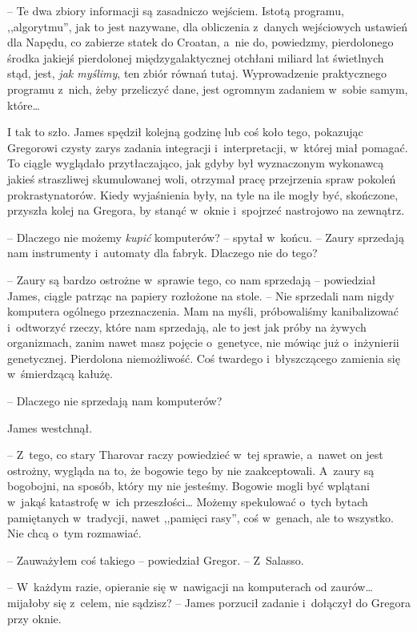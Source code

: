 \documentclass[oneside,polish,12pt,sfheadings]{mwbk}
\begin{document}
-- Te dwa zbiory informacji są zasadniczo wejściem. Istotą programu,
,,algorytmu'', jak to jest nazywane, dla obliczenia z~danych wejściowych
ustawień dla Napędu, co zabierze statek do Croatan, a~nie do, powiedzmy,
pierdolonego środka jakiejś pierdolonej międzygalaktycznej otchłani
miliard lat świetlnych stąd, jest, \emph{jak myślimy}, ten zbiór równań
tutaj. Wyprowadzenie praktycznego programu z~nich, żeby przeliczyć dane,
jest ogromnym zadaniem w~sobie samym, które\ldots

I tak to szło. James spędził kolejną godzinę lub coś koło tego,
pokazując Gregorowi czysty zarys zadania integracji i~interpretacji, w~której miał pomagać. To ciągle wyglądało przytłaczająco, jak gdyby był
wyznaczonym wykonawcą jakieś straszliwej skumulowanej woli, otrzymał
pracę przejrzenia spraw pokoleń prokrastynatorów. Kiedy wyjaśnienia
były, na tyle na ile mogły być, skończone, przyszła kolej na Gregora, by
stanąć w~oknie i~spojrzeć nastrojowo na zewnątrz.

-- Dlaczego nie możemy \emph{kupić} komputerów? -- spytał w~końcu. -- Zaury
sprzedają nam instrumenty i~automaty dla fabryk. Dlaczego nie do tego?

-- Zaury są bardzo ostrożne w~sprawie tego, co nam sprzedają -- powiedział
James, ciągle patrząc na papiery rozłożone na stole. -- Nie sprzedali nam
nigdy komputera ogólnego przeznaczenia. Mam na myśli, próbowaliśmy
kanibalizować i~odtworzyć rzeczy, które nam sprzedają, ale to jest jak
próby na żywych organizmach, zanim nawet masz pojęcie o~genetyce, nie
mówiąc już o~inżynierii genetycznej. Pierdolona niemożliwość. Coś
twardego i~błyszczącego zamienia się w~śmierdzącą kałużę.

-- Dlaczego nie sprzedają nam komputerów?

James westchnął. 

-- Z~tego, co stary Tharovar raczy powiedzieć w~tej
sprawie, a~nawet on jest ostrożny, wygląda na to, że bogowie tego by nie
zaakceptowali. A~zaury są bogobojni, na sposób, który my nie jesteśmy.
Bogowie mogli być wplątani w~jakąś katastrofę w~ich przeszłości\ldots
Możemy spekulować o~tych bytach pamiętanych w~tradycji, nawet ,,pamięci
rasy'', coś w~genach, ale to wszystko. Nie chcą o~tym rozmawiać.

-- Zauważyłem coś takiego -- powiedział Gregor. -- Z~Salasso.

-- W~każdym razie, opieranie się w~nawigacji na komputerach od zaurów\ldots
mijałoby się z~celem, nie sądzisz? -- James porzucił zadanie i~dołączył
do Gregora przy oknie.
\end{document}
